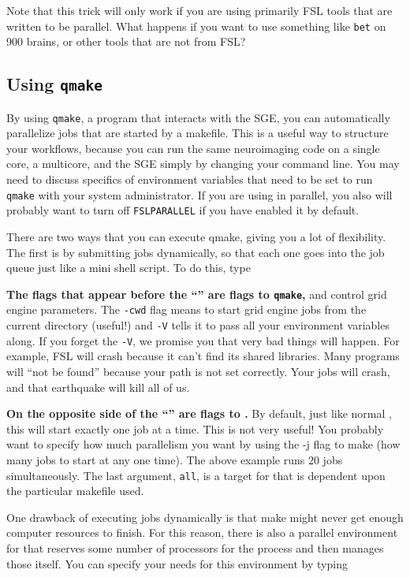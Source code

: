 Note that this trick will only work if you are using primarily FSL tools that are written to be parallel. What happens if you want to use something like \texttt{bet} on 900 brains, or other tools that are not from FSL?

\subsection{Using \texttt{qmake}}

By using \texttt{qmake}, a program that interacts with the SGE, you can automatically parallelize jobs that are started by a makefile. This is a useful way to structure your workflows, because you can run the same neuroimaging code on a single core, a multicore, and the SGE simply by changing your command line. You may need to discuss specifics of environment variables that need to be set to run \texttt{qmake} with your system administrator. If you are using \maken{} in parallel, you also will probably want to turn off \texttt{FSLPARALLEL} if you have enabled it by default.

There are two ways that you can execute qmake, giving you a lot of flexibility. The first is by submitting jobs dynamically, so that each one goes into the job queue just like a mini shell script. To do this, type

\textbf{The flags that appear before the ``\dd{}'' are flags to \texttt{qmake},} and control grid engine parameters. The \texttt{-cwd} flag means to start grid engine jobs from the current directory (useful!) and \texttt{-V} tells it to pass all your environment variables along. If you forget the \texttt{-V}, we promise you that very bad things will happen. For example, FSL will crash because it can't find its shared libraries. Many programs will ``not be found'' because your path is not set correctly. Your jobs will crash, and that earthquake will kill all of us.

\textbf{On the opposite side of the ``\dd{}'' are flags to \maken.} By default, just like normal \maken, this will start exactly one job at a time. This is not very useful! You probably want to specify how much parallelism you want by using the -j flag to make (how many jobs to start at any one time). The above example runs 20 jobs simultaneously. The last argument, \texttt{all}, is a target for \maken{} that is dependent upon the particular makefile used.

One drawback of executing jobs dynamically is that make might never get enough computer resources to finish. For this reason, there is also a parallel environment for \maken{} that reserves some number of processors for the \maken{} process and then manages those itself. You can specify your needs for this environment by typing

